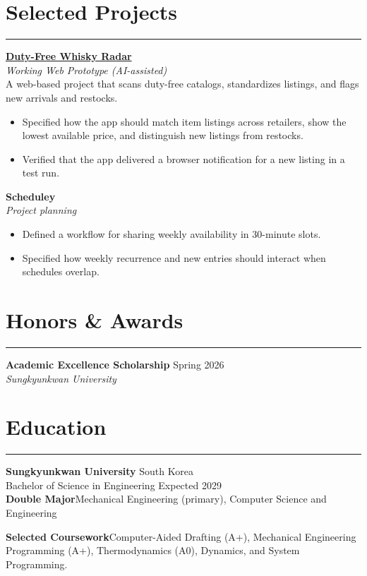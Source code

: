 \documentclass[letterpaper, 10pt]{article}
\begin{document}
\section*{Selected Projects}
\hrule
\vspace{4pt}

\noindent
\textbf{\href{https://dutyfree-whisky-radar.johnparkeryes.chatgpt.site}{Duty-Free Whisky Radar}}\\ 
\textit{Working Web Prototype (AI-assisted)}\\
A web-based project that scans duty-free catalogs, standardizes listings,
and flags new arrivals and restocks.
\begin{itemize}
    \item Specified how the app should match item listings across retailers, show the lowest available price, and distinguish new listings from restocks.
    \item Verified that the app delivered a browser notification for a new listing in a test run.
\end{itemize}

\noindent
\textbf{Scheduley}\\
\textit{Project planning}
\begin{itemize}
    \item Defined a workflow for sharing weekly availability in 30-minute slots.
    \item Specified how weekly recurrence and new entries should interact when schedules overlap.
\end{itemize}

\section*{Honors \& Awards}
\hrule
\vspace{4pt}
\noindent
\textbf{Academic Excellence Scholarship} \hfill Spring 2026\\
\textit{Sungkyunkwan University}

\section*{Education}
\hrule
\vspace{4pt}

\noindent
\textbf{Sungkyunkwan University} \hfill South Korea\\
Bachelor of Science in Engineering \hfill Expected 2029\\
\textbf{Double Major}\enspace Mechanical Engineering (primary),
Computer Science and Engineering

\smallskip
\noindent
\textbf{Selected Coursework}\enspace Computer-Aided Drafting (A+),
Mechanical Engineering Programming (A+), Thermodynamics (A0), Dynamics,
and System Programming.
\end{document}
